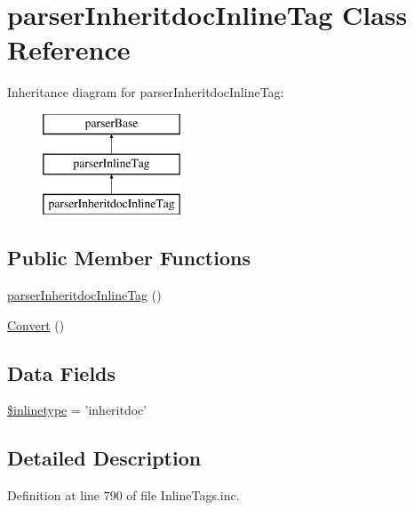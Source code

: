 \hypertarget{classparser_inheritdoc_inline_tag}{\section{parser\-Inheritdoc\-Inline\-Tag \-Class \-Reference}
\label{classparser_inheritdoc_inline_tag}
}
\-Inheritance diagram for parser\-Inheritdoc\-Inline\-Tag\-:\begin{figure}[H]
\begin{center}
\leavevmode
\includegraphics[height=3.000000cm]{classparser_inheritdoc_inline_tag}
\end{center}
\end{figure}
\subsection*{\-Public \-Member \-Functions}
\begin{DoxyCompactItemize}
\item 
\hyperlink{classparser_inheritdoc_inline_tag_af920abf43b34d56f33eab50127933498}{parser\-Inheritdoc\-Inline\-Tag} ()
\item 
\hyperlink{classparser_inheritdoc_inline_tag_a8ec835af4f74f124dab78001882a9ea9}{\-Convert} ()
\end{DoxyCompactItemize}
\subsection*{\-Data \-Fields}
\begin{DoxyCompactItemize}
\item 
\hyperlink{classparser_inheritdoc_inline_tag_a7583c1b3912b7afa3f038eb353a6ad97}{\$inlinetype} = 'inheritdoc'
\end{DoxyCompactItemize}


\subsection{\-Detailed \-Description}


\-Definition at line 790 of file \-Inline\-Tags.\-inc.



